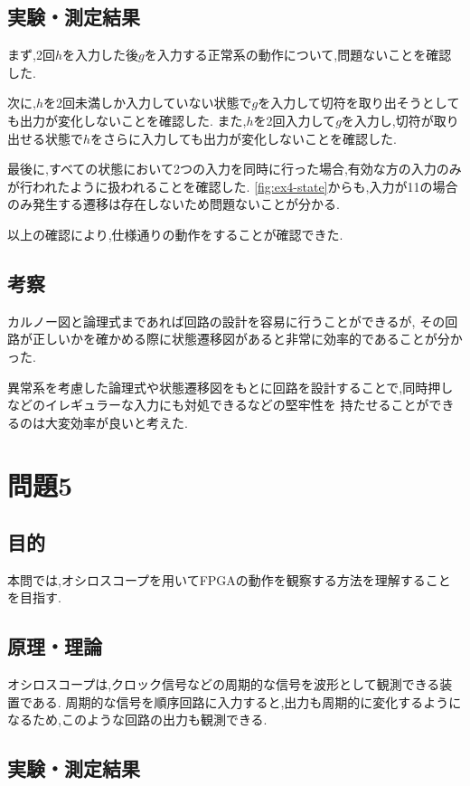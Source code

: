 \documentclass[autodetect-engine, dvi=dvipdfmx, 10pt, a4paper, ja=standard]{bxjsarticle}
\begin{document}
\subsection{実験・測定結果}
まず,2回$h$を入力した後$g$を入力する正常系の動作について,問題ないことを確認した.

次に,$h$を2回未満しか入力していない状態で$g$を入力して切符を取り出そうとしても出力が変化しないことを確認した.
また,$h$を2回入力して$g$を入力し,切符が取り出せる状態で$h$をさらに入力しても出力が変化しないことを確認した.

最後に,すべての状態において2つの入力を同時に行った場合,有効な方の入力のみが行われたように扱われることを確認した.
\ref{fig:ex4-state}からも,入力が11の場合のみ発生する遷移は存在しないため問題ないことが分かる.

以上の確認により,仕様通りの動作をすることが確認できた.

\subsection{考察}
カルノー図と論理式まであれば回路の設計を容易に行うことができるが,
その回路が正しいかを確かめる際に状態遷移図があると非常に効率的であることが分かった.

異常系を考慮した論理式や状態遷移図をもとに回路を設計することで,同時押しなどのイレギュラーな入力にも対処できるなどの堅牢性を
持たせることができるのは大変効率が良いと考えた.

\section{問題5}

\subsection{目的}

本問では,オシロスコープを用いてFPGAの動作を観察する方法を理解することを目指す.

\subsection{原理・理論}

オシロスコープは,クロック信号などの周期的な信号を波形として観測できる装置である.
周期的な信号を順序回路に入力すると,出力も周期的に変化するようになるため,このような回路の出力も観測できる.

\subsection{実験・測定結果}
\end{document}
